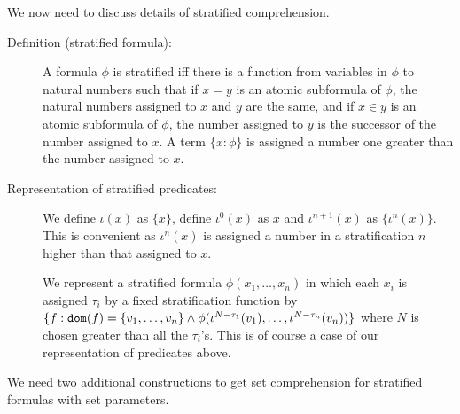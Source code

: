 \documentclass[12pt]{article}
\begin{document}
We now need to discuss details of stratified comprehension. 

\begin{description}

\item[Definition (stratified formula):]  A formula $\phi$ is stratified iff there is a function from variables in $\phi$ to natural numbers such that if $x=y$ is an atomic subformula of $\phi$, the natural numbers assigned to $x$ and $y$ are the same, and if $x \in y$ is an atomic subformula of $\phi$, the number assigned to $y$ is the successor of the number assigned to $x$.  A term $\{x:\phi\}$ is assigned a number one greater than the number assigned to $x$.

\item[Representation of stratified predicates:]  We define $\iota(x)$ as $\{x\}$, define $\iota^0(x)$ as $x$ and $\iota^{n+1}(x)$ as $\{\iota^n(x)\}$.  This is convenient as $\iota^n(x)$ is assigned a number in a stratification $n$ higher than that assigned to $x$.

We represent a stratified formula $\phi(x_1,\ldots,x_n)$ in which each $x_i$ is assigned $\tau_i$ by a fixed stratification function by $\{f:{\tt dom}(f)= \{v_1,\ldots,v_n\} \wedge \phi(\iota^{N-\tau_1}(v_1),\ldots,\iota^{N-\tau_n}(v_n))\}$ where $N$ is chosen greater than all the $\tau_i$'s.  This is of course a case of our representation of predicates above.

\end{description}

We need two additional constructions to get set comprehension for stratified formulas with set parameters.
\end{document}
